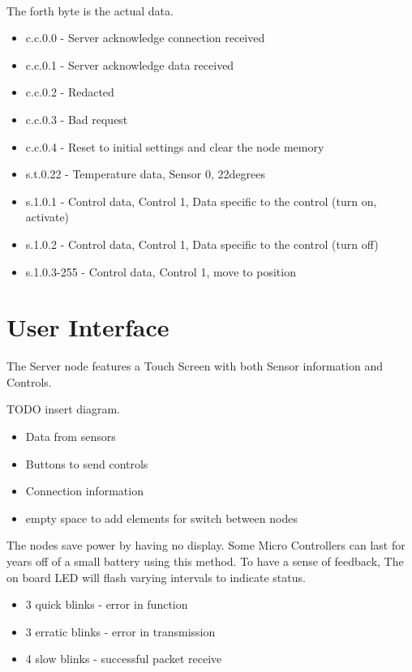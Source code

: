 \documentclass[]{report}
\begin{document}
	\paragraph{}
	The forth byte is the actual data.
	\begin{itemize}
		\item c.c.0.0  - Server acknowledge connection received
		\item c.c.0.1  - Server acknowledge data received
		\item c.c.0.2  - Redacted
		\item c.c.0.3  - Bad request 
		\item c.c.0.4  - Reset to initial settings and clear the node memory
		\item s.t.0.22 - Temperature data, Sensor 0, 22degrees
		\item s.1.0.1  - Control data, Control 1, Data specific to the control (turn on, activate)
		\item s.1.0.2  - Control data, Control 1, Data specific to the control (turn off)
		\item s.1.0.3-255 - Control data, Control 1, move to position
	\end{itemize}

\section{User Interface}
	The Server node features a Touch Screen with both Sensor information and Controls.
	
	TODO insert diagram.
	\begin{itemize}
		\item Data from sensors
		\item Buttons to send controls
		\item Connection information
		\item empty space to add elements for switch between nodes
	\end{itemize}

	The nodes save power by having no display. Some Micro Controllers can last for years off of a small battery using this method. To have a sense of feedback, The on board LED will flash varying intervals to indicate status.
	\begin{itemize}
		\item 3 quick blinks - error in function
		\item 3 erratic blinks - error in transmission
		\item 4 slow blinks - successful packet receive
	\end{itemize}
\end{document}
